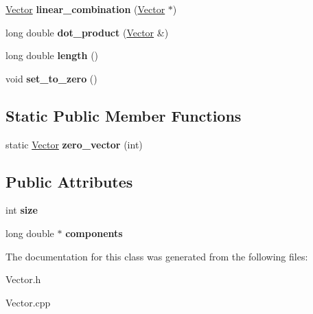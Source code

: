 \begin{DoxyCompactItemize}
\item 
\hypertarget{classVector_ad6b75253a11700407e751b1014529f9f}{\hyperlink{classVector}{Vector} {\bfseries linear\-\_\-combination} (\hyperlink{classVector}{Vector} $\ast$)}\label{classVector_ad6b75253a11700407e751b1014529f9f}

\item 
\hypertarget{classVector_a60344fec44a0e8e7c8fda219e2e95fb7}{long double {\bfseries dot\-\_\-product} (\hyperlink{classVector}{Vector} \&)}\label{classVector_a60344fec44a0e8e7c8fda219e2e95fb7}

\item 
\hypertarget{classVector_a1e34a844681b047a7b37e33e0f6a1065}{long double {\bfseries length} ()}\label{classVector_a1e34a844681b047a7b37e33e0f6a1065}

\item 
\hypertarget{classVector_a72376fdd5829260fe29766bce3299e5d}{void {\bfseries set\-\_\-to\-\_\-zero} ()}\label{classVector_a72376fdd5829260fe29766bce3299e5d}

\end{DoxyCompactItemize}
\subsection*{Static Public Member Functions}
\begin{DoxyCompactItemize}
\item 
\hypertarget{classVector_aafcfcdc34465991cda0dde79346b0908}{static \hyperlink{classVector}{Vector} {\bfseries zero\-\_\-vector} (int)}\label{classVector_aafcfcdc34465991cda0dde79346b0908}

\end{DoxyCompactItemize}
\subsection*{Public Attributes}
\begin{DoxyCompactItemize}
\item 
\hypertarget{classVector_ae13c6e730a6558ba444beb8f7e44d4ca}{int {\bfseries size}}\label{classVector_ae13c6e730a6558ba444beb8f7e44d4ca}

\item 
\hypertarget{classVector_a3c30ed4437d073d856a63547c3f730f6}{long double $\ast$ {\bfseries components}}\label{classVector_a3c30ed4437d073d856a63547c3f730f6}

\end{DoxyCompactItemize}


The documentation for this class was generated from the following files\-:\begin{DoxyCompactItemize}
\item 
Vector.\-h\item 
Vector.\-cpp\end{DoxyCompactItemize}
